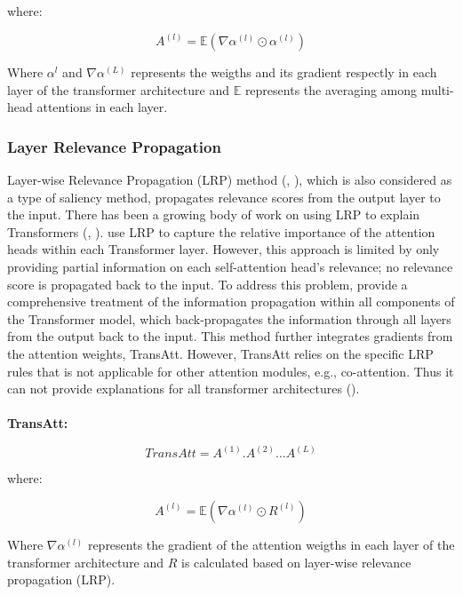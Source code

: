 where:

\begin{equation}
    A^{(l)}=\mathbb{E}(\nabla \alpha ^ {(l)} \odot \alpha ^ {(l)})
\end{equation}

Where $\alpha ^ {l}$ and $\nabla \alpha ^ {(L)}$  represents the weigths and its gradient respectly in each layer of the transformer architecture and $\mathbb{E}$ represents the averaging
among multi-head attentions in each layer.

\subsubsection{Layer Relevance Propagation}

Layer-wise Relevance Propagation (LRP) method (\cite{bach2015pixel}, \cite{montavon2017explaining}),
which is also considered as a type of saliency method, propagates relevance scores from the output layer to the input. There has been a growing body of work on using LRP to explain Transformers
(\cite{voita2019analyzing}, \cite{chefer2021transformer}). \cite{voita2019analyzing} use LRP to capture the relative importance of the attention heads within each Transformer layer. However, this approach is limited by only
providing partial information on each self-attention head’s relevance; no relevance score is propagated back to the input. To address this problem, \cite{chefer2021transformer} provide a comprehensive treatment of the information propagation within all components of the Transformer model, which back-propagates
the information through all layers from the output back to the input. This method further integrates gradients from the attention weights, TransAtt. However, TransAtt relies on the
specific LRP rules that is not applicable for other attention modules, e.g., co-attention. Thus it can not provide explanations for all transformer architectures (\cite{chefer2021generic}).
\\\\
\textbf{TransAtt:}

\begin{equation}
    TransAtt=A^{(1)} . A^{(2)} \dots A^{(L)}
\end{equation}

where:

\begin{equation}
    A^{(l)}=\mathbb{E}(\nabla \alpha ^ {(l)} \odot R ^ {(l)})
\end{equation}

Where $\nabla \alpha ^ {(l)}$ represents the gradient of the attention weigths in each layer of the transformer architecture and $R$ is calculated based on
layer-wise relevance propagation (LRP).

